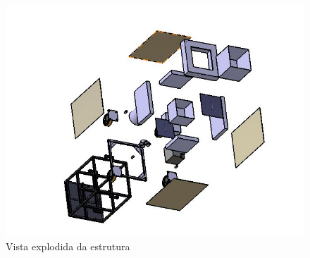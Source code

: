 \begin{figure}[H]
	\centering
	\includegraphics[scale=.5]{figuras/VistaExplodida.JPG}
	\caption{Vista explodida da estrutura}
\end{figure}

